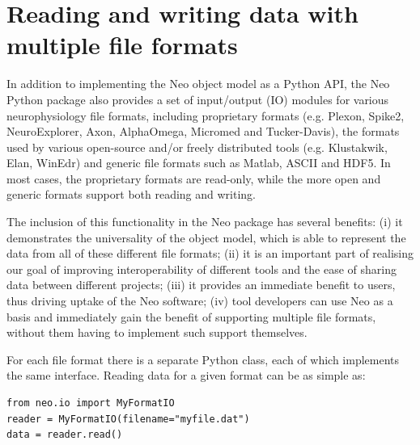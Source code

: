 \documentclass{frontiers}
\begin{document}
\section{Reading and writing data with multiple file formats}


In addition to implementing the Neo object model as a Python API, the Neo Python package also provides a set of input/output (IO) modules for various neurophysiology file formats, including proprietary formats (e.g. Plexon, Spike2, NeuroExplorer, Axon, AlphaOmega, Micromed and Tucker-Davis), the formats used by various open-source and/or freely distributed tools (e.g. Klustakwik, Elan, WinEdr) and generic file formats such as Matlab, ASCII and HDF5. 
In most cases, the proprietary formats are read-only, while the more open and generic formats support both reading and writing.

The inclusion of this functionality in the Neo package has several benefits:
(i) it demonstrates the universality of the object model, which is able to represent the data from all of these different file formats;
(ii) it is an important part of realising our goal of improving interoperability of different tools and the ease of sharing data between different projects;
(iii) it provides an immediate benefit to users, thus driving uptake of the Neo software;
(iv) tool developers can use Neo as a basis and immediately gain the benefit of supporting multiple file formats, without them having to implement such support themselves.


For each file format there is a separate Python class, each of which implements the same interface. Reading data for a given format can be as simple as:

\begin{lstlisting}[style=display]
from neo.io import MyFormatIO
reader = MyFormatIO(filename="myfile.dat")
data = reader.read()
\end{lstlisting}
\end{document}
